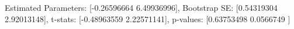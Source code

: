 Estimated Parameters: [-0.26596664  6.49936996], Bootstrap SE: [0.54319304 2.92013148], t-stats: [-0.48963559  2.22571141], p-values: [0.63753498 0.0566749 ]